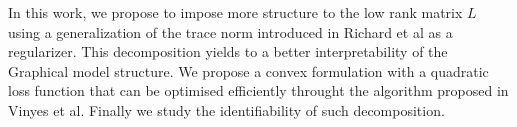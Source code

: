 In this work, we propose to impose more structure to the low rank matrix $L$ using a generalization of the trace norm introduced in Richard et al as a regularizer. This decomposition yields to a better interpretability of the Graphical model structure. We propose a convex formulation with a quadratic loss function that can be optimised efficiently throught the algorithm proposed in Vinyes et al.  Finally we study the identifiability of such decomposition. 

%
